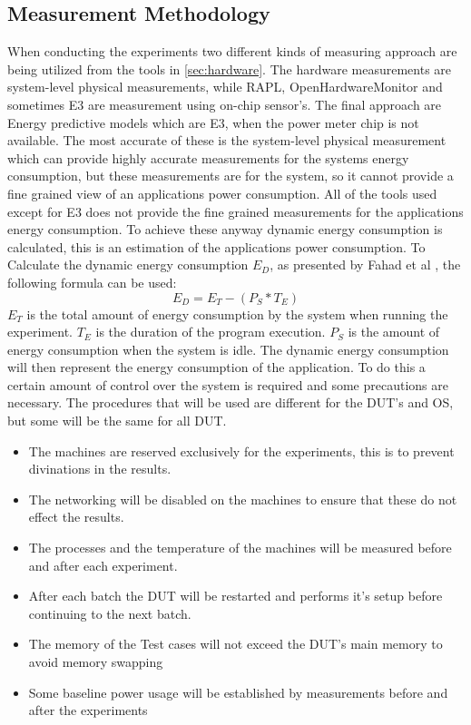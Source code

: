 \subsection{Measurement Methodology}
When conducting the experiments two different kinds of measuring approach are being utilized from the tools in \cref{sec:hardware}.
The hardware measurements are system-level physical measurements, while RAPL, OpenHardwareMonitor and sometimes E3 are measurement using on-chip sensor's. The final approach are Energy predictive models which are E3, when the power meter chip is not available. The most accurate of these is the system-level physical measurement which can provide highly accurate measurements for the systems energy consumption, but these measurements are for the system, so it cannot provide a fine grained view of an applications power consumption. All of the tools used except for E3 does not provide the fine grained measurements for the applications energy consumption. To achieve these anyway dynamic energy consumption is calculated, this is an estimation of the applications power consumption. To Calculate the dynamic energy consumption $E_D$, as presented by Fahad et al \cite{fahad2019comparative}, the following formula can be used:
$$E_D = E_T -(P_S * T_E)$$
$E_T$ is the total amount of energy consumption by the system when running the experiment. $T_E$ is the duration of the program execution. $P_S$ is the amount of energy consumption when the system is idle. The dynamic energy consumption will then represent the energy consumption of the application. To do this a certain amount of control over the system is required and some precautions are necessary. The procedures that will be used are different for the DUT's and OS, but some will be the same for all DUT.
\begin{itemize}
    \item The machines are reserved exclusively for the experiments, this is to prevent divinations in the results.
    \item The networking will be disabled on the machines to ensure that these do not effect the results.
    \item The processes and the temperature of the machines will be measured before and after each experiment.
    \item After each batch the DUT will be restarted and performs it's setup before continuing to the next batch.
    \item The memory of the Test cases will not exceed the DUT's main memory to avoid memory swapping
    \item Some baseline power usage will be established by measurements before and after the experiments
\end{itemize}
